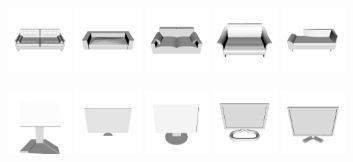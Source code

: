 \begin{figure}[!t]
	\includegraphics[width=0.15\textwidth]{Figures/ObjRecog/sofa_0}\hfill
	\includegraphics[width=0.15\textwidth]{Figures/ObjRecog/sofa_1}\hfill
	\includegraphics[width=0.15\textwidth]{Figures/ObjRecog/sofa_2}\hfill
	\includegraphics[width=0.15\textwidth]{Figures/ObjRecog/sofa_3}\hfill
	\includegraphics[width=0.15\textwidth]{Figures/ObjRecog/sofa_4}\hfill

	\includegraphics[width=0.15\textwidth]{Figures/ObjRecog/monitor_0}\hfill
	\includegraphics[width=0.15\textwidth]{Figures/ObjRecog/monitor_1}\hfill
	\includegraphics[width=0.15\textwidth]{Figures/ObjRecog/monitor_2}\hfill
	\includegraphics[width=0.15\textwidth]{Figures/ObjRecog/monitor_3}\hfill
	\includegraphics[width=0.15\textwidth]{Figures/ObjRecog/monitor_4}\hfill


\end{figure}
